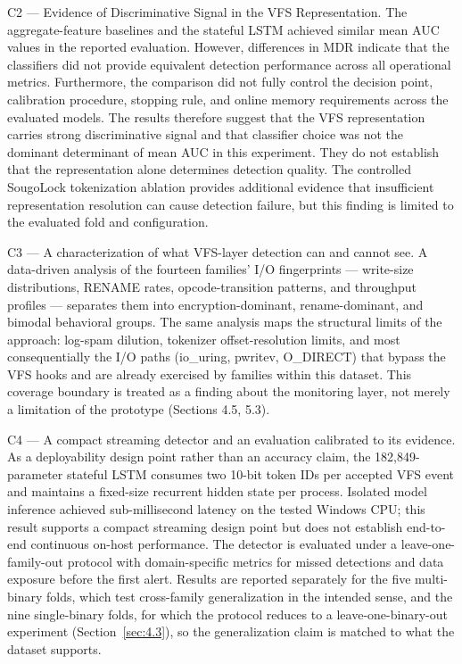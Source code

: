 C2 --- Evidence of Discriminative Signal in the VFS Representation. The aggregate-feature baselines and the stateful \textmu{}LSTM achieved similar mean AUC values in the reported evaluation. However, differences in MDR indicate that the classifiers did not provide equivalent detection performance across all operational metrics. Furthermore, the comparison did not fully control the decision point, calibration procedure, stopping rule, and online memory requirements across the evaluated models. The results therefore suggest that the VFS representation carries strong discriminative signal and that classifier choice was not the dominant determinant of mean AUC in this experiment. They do not establish that the representation alone determines detection quality. The controlled SougoLock tokenization ablation provides additional evidence that insufficient representation resolution can cause detection failure, but this finding is limited to the evaluated fold and configuration.

C3 --- A characterization of what VFS-layer detection can and cannot see. A data-driven analysis of the fourteen families' I/\allowbreak{}O fingerprints --- write-size distributions, RENAME rates, opcode-transition patterns, and throughput profiles --- separates them into encryption-dominant, rename-dominant, and bimodal behavioral groups. The same analysis maps the structural limits of the approach: log-spam dilution, tokenizer offset-resolution limits, and most consequentially the I/\allowbreak{}O paths (io\_\allowbreak{}uring, pwritev, O\_\allowbreak{}DIRECT) that bypass the VFS hooks and are already exercised by families within this dataset. This coverage boundary is treated as a finding about the monitoring layer, not merely a limitation of the prototype (Sections 4.5, 5.3).

C4 --- A compact streaming detector and an evaluation calibrated to its evidence. As a deployability design point rather than an accuracy claim, the 182,849-parameter stateful \textmu{}LSTM consumes two 10-bit token IDs per accepted VFS event and maintains a fixed-size recurrent hidden state per process. Isolated model inference achieved sub-millisecond latency on the tested Windows CPU; this result supports a compact streaming design point but does not establish end-to-end continuous on-host performance. The detector is evaluated under a leave-one-family-out protocol with domain-specific metrics for missed detections and data exposure before the first alert. Results are reported separately for the five multi-binary folds, which test cross-family generalization in the intended sense, and the nine single-binary folds, for which the protocol reduces to a leave-one-binary-out experiment (Section~\ref{sec:4.3}), so the generalization claim is matched to what the dataset supports.

